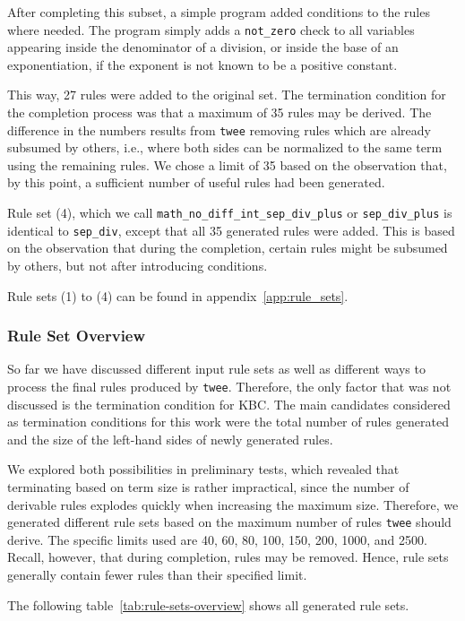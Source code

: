 After completing this subset, a simple program added conditions to the rules where needed. The program simply adds a \texttt{not\_zero} check to all variables appearing inside the denominator of a division, or inside the base of an exponentiation, if the exponent is not known to be a positive constant.

This way, 27 rules were added to the original set. The termination condition for the completion process was that a maximum of 35 rules may be derived. The difference in the numbers results from \texttt{twee} removing rules which are already subsumed by others, i.e., where both sides can be normalized to the same term using the remaining rules. We chose a limit of 35 based on the observation that, by this point, a sufficient number of useful rules had been generated.

Rule set (4), which we call \texttt{math\_no\_diff\_int\_sep\_div\_plus} or \texttt{sep\_div\_plus} is identical to \texttt{sep\_div}, except that all 35 generated rules were added. This is based on the observation that during the completion, certain rules might be subsumed by others, but not after introducing conditions. 

Rule sets (1) to (4) can be found in appendix~\ref{app:rule_sets}.

\subsubsection{Rule Set Overview}
So far we have discussed different input rule sets as well as different ways to process the final rules produced by \texttt{twee}. Therefore, the only factor that was not discussed is the termination condition for KBC. The main candidates considered as termination conditions for this work were the total number of rules generated and the size of the left-hand sides of newly generated rules. 

We explored both possibilities in preliminary tests, which revealed that terminating based on term size is rather impractical, since the number of derivable rules explodes quickly when increasing the maximum size. Therefore, we generated different rule sets based on the maximum number of rules \texttt{twee} should derive. The specific limits used are 40, 60, 80, 100, 150, 200, 1000, and 2500. Recall, however, that during completion, rules may be removed. Hence, rule sets generally contain fewer rules than their specified limit.

The following table~\ref{tab:rule-sets-overview} shows all generated rule sets.

